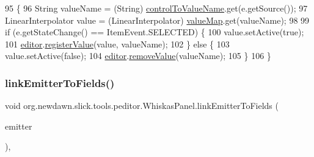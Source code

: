 \begin{DoxyCode}
95                                                      \{
96         String valueName = (String) \mbox{\hyperlink{classorg_1_1newdawn_1_1slick_1_1tools_1_1peditor_1_1_whiskas_panel_adff62f4a99ab444f80c37b40d9ff0489}{controlToValueName}}.get(e.getSource());
97         LinearInterpolator value = (LinearInterpolator) \mbox{\hyperlink{classorg_1_1newdawn_1_1slick_1_1tools_1_1peditor_1_1_whiskas_panel_a952aebc524d9c88dc4dc7bb7e2231fd1}{valueMap}}.get(valueName);
98 
99         \textcolor{keywordflow}{if} (e.getStateChange() == ItemEvent.SELECTED) \{
100             value.setActive(\textcolor{keyword}{true});
101             \mbox{\hyperlink{classorg_1_1newdawn_1_1slick_1_1tools_1_1peditor_1_1_whiskas_panel_adafc0fc72d0d368d6298c3c44e4fa96c}{editor}}.\mbox{\hyperlink{classorg_1_1newdawn_1_1slick_1_1tools_1_1peditor_1_1_graph_editor_window_a791df9707751b4a07bbd20ede78b19a0}{registerValue}}(value, valueName);
102         \} \textcolor{keywordflow}{else} \{
103             value.setActive(\textcolor{keyword}{false});
104             \mbox{\hyperlink{classorg_1_1newdawn_1_1slick_1_1tools_1_1peditor_1_1_whiskas_panel_adafc0fc72d0d368d6298c3c44e4fa96c}{editor}}.\mbox{\hyperlink{classorg_1_1newdawn_1_1slick_1_1tools_1_1peditor_1_1_graph_editor_window_a97634b26159ce4a4c2019bad590bc51e}{removeValue}}(valueName);
105         \}
106     \}
\end{DoxyCode}
\mbox{\label{classorg_1_1newdawn_1_1slick_1_1tools_1_1peditor_1_1_whiskas_panel_a71a90d8afe5a7f2eefc72aecc4b07640}} 
\subsubsection{\texorpdfstring{link\+Emitter\+To\+Fields()}{linkEmitterToFields()}}
{\footnotesize\ttfamily void org.\+newdawn.\+slick.\+tools.\+peditor.\+Whiskas\+Panel.\+link\+Emitter\+To\+Fields (\begin{DoxyParamCaption}\item[{\mbox{\hyperlink{classorg_1_1newdawn_1_1slick_1_1particles_1_1_configurable_emitter}{Configurable\+Emitter}}}]{emitter }\end{DoxyParamCaption})\hspace{0.3cm}{\ttfamily [inline]}, {\ttfamily [protected]}}


